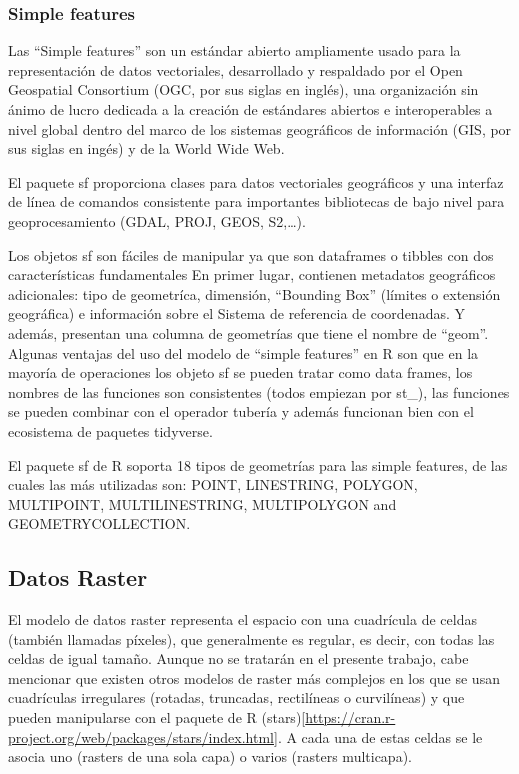 \documentclass[12pt,a4paper,]{book}
\numberwithin{dummy}{section}
\theoremstyle{ocrenumbox}
\theoremstyle{blacknumex}
\theoremstyle{blacknumbox}
\theoremstyle{ocrenum}
\theoremstyle{ocrenum}
\begin{document}
\hypertarget{simple-features}{%
\subsubsection{Simple features}\label{simple-features}}

Las ``Simple features'' son un estándar abierto ampliamente usado para
la representación de datos vectoriales, desarrollado y respaldado por el
Open Geospatial Consortium (OGC, por sus siglas en inglés), una
organización sin ánimo de lucro dedicada a la creación de estándares
abiertos e interoperables a nivel global dentro del marco de los
sistemas geográficos de información (GIS, por sus siglas en ingés) y de
la World Wide Web.

El paquete sf proporciona clases para datos vectoriales geográficos y
una interfaz de línea de comandos consistente para importantes
bibliotecas de bajo nivel para geoprocesamiento (GDAL, PROJ, GEOS,
S2,\ldots).

Los objetos sf son fáciles de manipular ya que son dataframes o tibbles
con dos características fundamentales En primer lugar, contienen
metadatos geográficos adicionales: tipo de geometríca, dimensión,
``Bounding Box'' (límites o extensión geográfica) e información sobre el
Sistema de referencia de coordenadas. Y además, presentan una columna de
geometrías que tiene el nombre de ``geom''. Algunas ventajas del uso del
modelo de ``simple features'' en R son que en la mayoría de operaciones
los objeto sf se pueden tratar como data frames, los nombres de las
funciones son consistentes (todos empiezan por st\_), las funciones se
pueden combinar con el operador tubería y además funcionan bien con el
ecosistema de paquetes tidyverse.

El paquete sf de R soporta 18 tipos de geometrías para las simple
features, de las cuales las más utilizadas son: POINT, LINESTRING,
POLYGON, MULTIPOINT, MULTILINESTRING, MULTIPOLYGON and
GEOMETRYCOLLECTION.

\hypertarget{datos-raster}{%
\subsection{Datos Raster}\label{datos-raster}}

El modelo de datos raster representa el espacio con una cuadrícula de
celdas (también llamadas píxeles), que generalmente es regular, es
decir, con todas las celdas de igual tamaño. Aunque no se tratarán en el
presente trabajo, cabe mencionar que existen otros modelos de raster más
complejos en los que se usan cuadrículas irregulares (rotadas,
truncadas, rectilíneas o curvilíneas) y que pueden manipularse con el
paquete de R
(stars){[}\url{https://cran.r-project.org/web/packages/stars/index.html}{]}.
A cada una de estas celdas se le asocia uno (rasters de una sola capa) o
varios (rasters multicapa).
\end{document}
